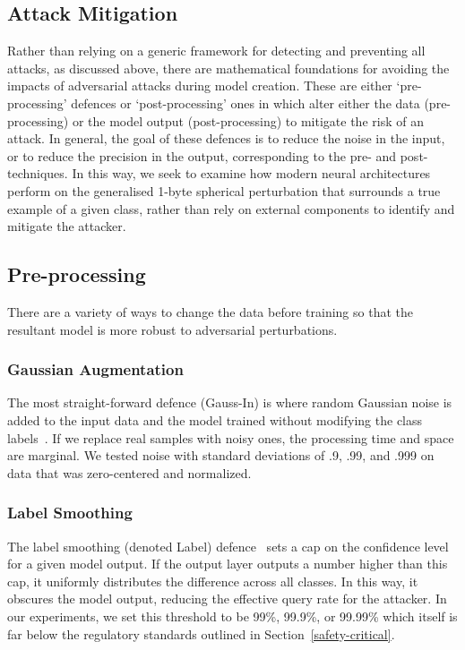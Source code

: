 \documentclass[journal]{IEEEtran}
\begin{document}
\subsection{Attack Mitigation}

Rather than relying on a generic framework for detecting and preventing all attacks, as discussed above, there are mathematical foundations for avoiding the impacts of adversarial attacks during model creation.
These are either `pre-processing' defences or `post-processing' ones in which alter either the data (pre-processing) or the model output (post-processing) to mitigate the risk of an attack.
In general, the goal of these defences is to reduce the noise in the input, or to reduce the precision in the output, corresponding to the pre- and post- techniques.
In this way, we seek to examine how modern neural architectures perform on the generalised 1-byte spherical perturbation that surrounds a true example of a given class, rather than rely on external components to identify and mitigate the attacker.


\subsection{Pre-processing}
\label{pre-processing}
There are a variety of ways to change the data before training so that the resultant model is more robust to adversarial perturbations.

\subsubsection{Gaussian Augmentation}
The most straight-forward defence (Gauss-In) is where random Gaussian noise is added to the input data and the model trained without modifying the class labels~\cite{gauss_aug}.
If we replace real samples with noisy ones, the processing time and space are marginal.
We tested noise with standard deviations of .9, .99, and .999 on data that was zero-centered and normalized.

\subsubsection{Label Smoothing}
The label smoothing (denoted Label) defence~\cite{label_smoothing} sets a cap on the confidence level for a given model output.
If the output layer outputs a number higher than this cap, it uniformly distributes the difference across all classes.
In this way, it obscures the model output, reducing the effective query rate for the attacker.
In our experiments, we set this threshold to be 99\%,  99.9\%,  or 99.99\% which itself is far below the regulatory standards outlined in Section~\ref{safety-critical}.
\end{document}
